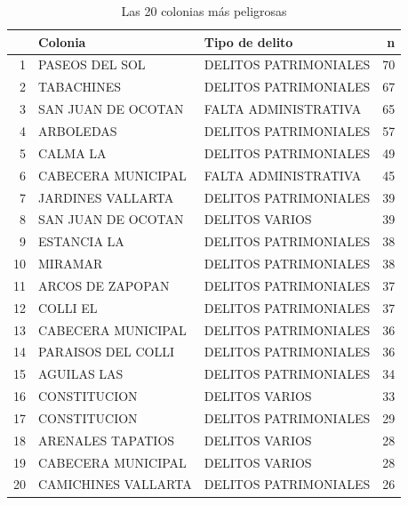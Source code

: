 \begin{table}[H]
\centering
\caption{Las 20 colonias más peligrosas} 
\begin{tabular}{rllr}
  \hline
 & Colonia & Tipo de delito & n \\ 
  \hline
1 & PASEOS DEL SOL & DELITOS PATRIMONIALES &  70 \\ 
  2 & TABACHINES & DELITOS PATRIMONIALES &  67 \\ 
  3 & SAN JUAN DE OCOTAN & FALTA ADMINISTRATIVA &  65 \\ 
  4 & ARBOLEDAS & DELITOS PATRIMONIALES &  57 \\ 
  5 & CALMA LA & DELITOS PATRIMONIALES &  49 \\ 
  6 & CABECERA MUNICIPAL & FALTA ADMINISTRATIVA &  45 \\ 
  7 & JARDINES VALLARTA & DELITOS PATRIMONIALES &  39 \\ 
  8 & SAN JUAN DE OCOTAN & DELITOS VARIOS &  39 \\ 
  9 & ESTANCIA LA & DELITOS PATRIMONIALES &  38 \\ 
  10 & MIRAMAR & DELITOS PATRIMONIALES &  38 \\ 
  11 & ARCOS DE ZAPOPAN & DELITOS PATRIMONIALES &  37 \\ 
  12 & COLLI EL & DELITOS PATRIMONIALES &  37 \\ 
  13 & CABECERA MUNICIPAL & DELITOS PATRIMONIALES &  36 \\ 
  14 & PARAISOS DEL COLLI & DELITOS PATRIMONIALES &  36 \\ 
  15 & AGUILAS LAS & DELITOS PATRIMONIALES &  34 \\ 
  16 & CONSTITUCION & DELITOS VARIOS &  33 \\ 
  17 & CONSTITUCION & DELITOS PATRIMONIALES &  29 \\ 
  18 & ARENALES TAPATIOS & DELITOS VARIOS &  28 \\ 
  19 & CABECERA MUNICIPAL & DELITOS VARIOS &  28 \\ 
  20 & CAMICHINES VALLARTA & DELITOS PATRIMONIALES &  26 \\ 
   \hline
\end{tabular}
\end{table}

